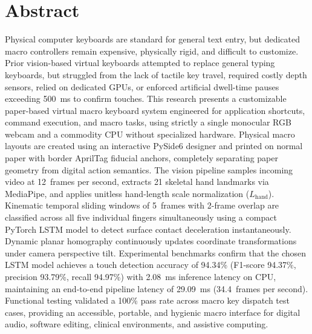 \thispagestyle{plain}
\chapter*{Abstract}

\noindent Physical computer keyboards are standard for general text entry, but dedicated macro controllers remain expensive, physically rigid, and difficult to customize. Prior vision-based virtual keyboards attempted to replace general typing keyboards, but struggled from the lack of tactile key travel, required costly depth sensors, relied on dedicated GPUs, or enforced artificial dwell-time pauses exceeding 500~ms to confirm touches. This research presents a customizable paper-based virtual macro keyboard system engineered for application shortcuts, command execution, and macro tasks, using strictly a single monocular RGB webcam and a commodity CPU without specialized hardware. Physical macro layouts are created using an interactive PySide6 designer and printed on normal paper with border AprilTag fiducial anchors, completely separating paper geometry from digital action semantics. The vision pipeline samples incoming video at 12~frames per second, extracts 21 skeletal hand landmarks via MediaPipe, and applies unitless hand-length scale normalization ($L_{\text{hand}}$). Kinematic temporal sliding windows of 5~frames with 2-frame overlap are classified across all five individual fingers simultaneously using a compact PyTorch LSTM model to detect surface contact deceleration instantaneously. Dynamic planar homography continuously updates coordinate transformations under camera perspective tilt. Experimental benchmarks confirm that the chosen LSTM model achieves a touch detection accuracy of 94.34\% (F1-score 94.37\%, precision 93.79\%, recall 94.97\%) with 2.08~ms inference latency on CPU, maintaining an end-to-end pipeline latency of 29.09~ms (34.4~frames per second). Functional testing validated a 100\% pass rate across macro key dispatch test cases, providing an accessible, portable, and hygienic macro interface for digital audio, software editing, clinical environments, and assistive computing.
